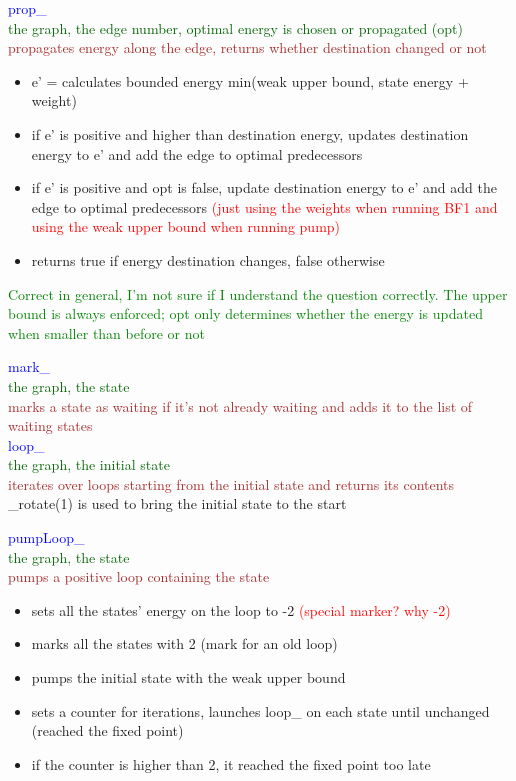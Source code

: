 \documentclass{rapport}
\newcommand{\pscrep}[1]{\textcolor{green}{#1}}
\begin{document}
\vspace{12pt}

\textcolor{blue}{prop_} \\
\textcolor[HTML]{006400}{the graph, the edge number, optimal energy is chosen or propagated (opt)}\\
\textcolor{brown}{propagates energy along the edge, returns whether destination changed or not}
\begin{itemize}
    \item e’ = calculates bounded energy min(weak upper bound, state energy + weight)
    \item if e’ is positive and higher than destination energy, updates destination energy to e’ and add the edge to optimal predecessors
    \item if e’ is positive and opt is false, update destination energy to e’ and add the edge to optimal predecessors \textcolor{red}{(just using the weights when running BF1 and using the weak upper bound when running pump)}
    \item returns true if energy destination changes, false otherwise
\end{itemize}
\pscrep{Correct in general, I'm not sure if I understand the question correctly. The upper bound is always enforced; opt only determines whether the energy is updated when smaller than before or not}

\vspace{12pt}

\textcolor{blue}{mark_}\\
\textcolor[HTML]{006400}{the graph, the state}\\
\textcolor{brown}{marks a state as waiting if it’s not already waiting and adds it to the list of waiting states}\\

\textcolor{blue}{loop_}\\
\textcolor[HTML]{006400}{the graph, the initial state}\\
\textcolor{brown}{iterates over loops starting from the initial state and returns its contents}\\
\_rotate(1) is used to bring the initial state to the start\\

\newpage

\textcolor{blue}{pumpLoop_}\\
\textcolor[HTML]{006400}{the graph, the state}\\
\textcolor{brown}{pumps a positive loop containing the state}
\begin{itemize}
    \item sets all the states’ energy on the loop to -2 \textcolor{red}{(special marker? why -2)}
    \item marks all the states with 2 (mark for an old loop)
    \item pumps the initial state with the weak upper bound
    \item sets a counter for iterations, launches loop\_ on each state until unchanged (reached the fixed point)
    \item if the counter is higher than 2, it reached the fixed point too late
\end{itemize}
\end{document}
